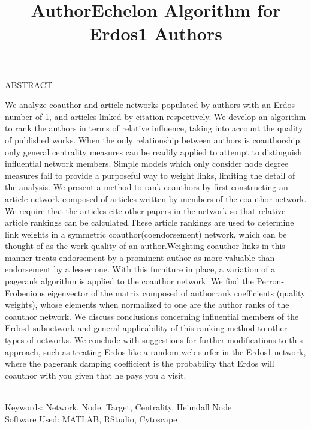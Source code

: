 \documentclass[17pt]{extarticle}
\title{AuthorEchelon Algorithm for Erdos1 Authors}
\begin{document}


\maketitle
\thispagestyle{fancy}

\begin{center}
ABSTRACT
\end{center}

\indent


\begin{small}
\indent
 We analyze coauthor and article networks populated by authors with an Erdos number of 1, and articles linked by citation respectively.  We develop an algorithm to rank the authors in terms of relative influence, taking into account the quality of published works. When the only relationship between authors is coauthorship, only general centrality measures can be readily applied to attempt to distinguish influential network members. Simple models which only consider node degree measures fail to provide a purposeful way to weight links, limiting the detail of the analysis. We present a method to rank coauthors by first constructing an article network composed of articles written by members of the coauthor network. We require that the articles cite other papers in the network so that relative article rankings can be calculated.These article rankings are used to determine link weights in a symmetric coauthor(coendorsement) network, which can be thought of as the work quality of an author.Weighting coauthor links in this manner treats endorsement by a prominent author as more valuable than endorsement by a lesser one. With this furniture in place, a variation of a pagerank algorithm is applied to the coauthor network. We find the Perron-Frobenious eigenvector of the matrix composed of authorrank coefficients (quality weights), whose elements when normalized to one are the author ranks of the coauthor network. We discuss conclusions concerning influential members of the Erdos1 subnetwork and general applicability of this ranking method to other types of networks. We conclude with suggestions for further modifications to this approach, such as treating Erdos like a random web surfer in the Erdos1 network, where the pagerank damping coefficient is the probability that Erdos will coauthor with you given that he pays you a visit.

\quad \\
Keywords: Network, Node, Target, Centrality, Heimdall Node \\
Software Used: MATLAB, RStudio, Cytoscape

\end{small}
\end{document}
